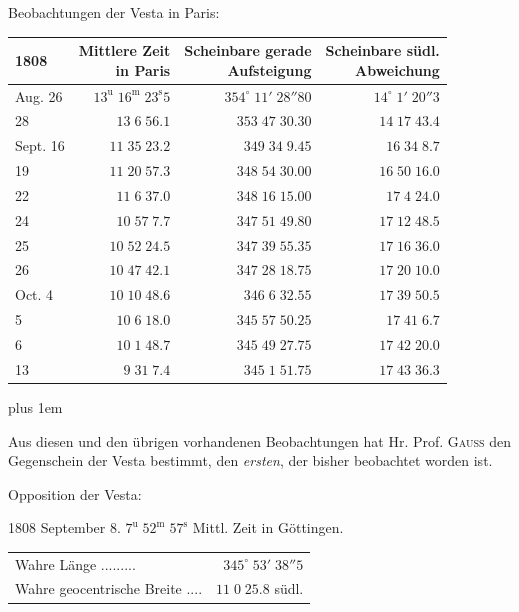 \begin{center}
Beobachtungen der Vesta in Paris:
\end{center}


\begin{center}\fontsize{10}{12}\selectfont\setlength{\tabcolsep}{5pt}\renewcommand{\arraystretch}{1.15}\begin{tabular}{lrrr}
1808 & \shortstack{Mittlere Zeit\\in Paris} & \shortstack{Scheinbare gerade\\Aufsteigung} & \shortstack{Scheinbare südl.\\Abweichung}\\
\hline
Aug. 26 & $13^{\text{u}}\;16^{\text{m}}\;23^{\text{s}}5$ & $354^\circ\;11'\;28''80$ & $14^\circ\;1'\;20''3$\\
28 & $13\;6\;56.1$ & $353\;47\;30.30$ & $14\;17\;43.4$\\
Sept. 16 & $11\;35\;23.2$ & $349\;34\;9.45$ & $16\;34\;8.7$\\
19 & $11\;20\;57.3$ & $348\;54\;30.00$ & $16\;50\;16.0$\\
22 & $11\;6\;37.0$ & $348\;16\;15.00$ & $17\;4\;24.0$\\
24 & $10\;57\;7.7$ & $347\;51\;49.80$ & $17\;12\;48.5$\\
25 & $10\;52\;24.5$ & $347\;39\;55.35$ & $17\;16\;36.0$\\
26 & $10\;47\;42.1$ & $347\;28\;18.75$ & $17\;20\;10.0$\\
Oct.  4 & $10\;10\;48.6$ & $346\;6\;32.55$ & $17\;39\;50.5$\\
5 & $10\;6\;18.0$ & $345\;57\;50.25$ & $17\;41\;6.7$\\
6 & $10\;1\;48.7$ & $345\;49\;27.75$ & $17\;42\;20.0$\\
13 & $9\;31\;7.4$ & $345\;1\;51.75$ & $17\;43\;36.3$\\
\end{tabular}\end{center}


{\rightskip=0pt plus 1em \par\indent Aus diesen und den übrigen vorhandenen Beobachtungen hat Hr. Prof. \textsc{Gauss} den Gegenschein der Vesta bestimmt, den \emph{ersten}, der bisher beobachtet worden ist.\par}

\begin{center}Opposition der Vesta:

1808 September 8. $7^{\text{u}}\;52^{\text{m}}\;57^{\text{s}}$ Mittl. Zeit in Göttingen.
\end{center}
\begin{center}\fontsize{10}{12}\selectfont\setlength{\tabcolsep}{5pt}\renewcommand{\arraystretch}{1.15}\begin{tabular}{lr}

Wahre Länge .\;.\;.\;.\;.\;.\;.\;.\;.\; & $345^\circ\;53'\;38''5$\\
Wahre geocentrische Breite .\;.\;.\;.\; & $11\;0\;25.8$ südl.\\
\end{tabular}\end{center}


